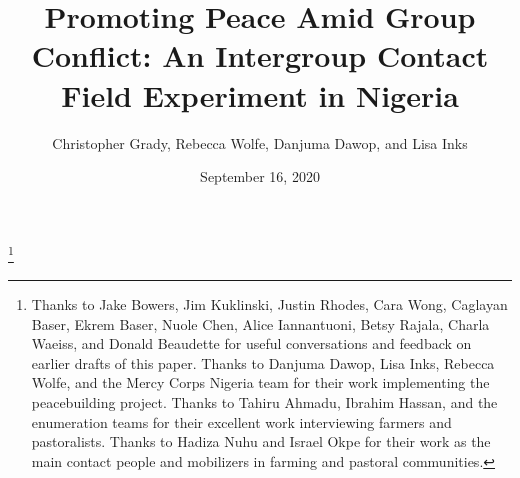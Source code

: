 \documentclass[11pt]{article}
\title{Promoting Peace Amid Group Conflict: An Intergroup Contact Field
Experiment in Nigeria}
\author{\parbox{.7\linewidth}{\centering
Christopher Grady, Rebecca Wolfe, Danjuma Dawop, and Lisa Inks
}
}
\date{September 16, 2020}
\begin{document}
\VerbatimFootnotes

%
%
%
%
%
%
%
%
%
%

\newlength{\cslhangindent}
\setlength{\cslhangindent}{1.5em}
\newenvironment{cslreferences}%
  {\setlength{\parindent}{0pt}%
  \everypar{\setlength{\hangindent}{\cslhangindent}}\ignorespaces}%
  {\par}

\maketitle


\newcommand\blfootnote[1]{%
  \begingroup
  \renewcommand\thefootnote{}\footnote{#1}%
  \addtocounter{footnote}{-1}%
  \endgroup
}
\singlespacing\blfootnote{Thanks to Jake Bowers, Jim Kuklinski, Justin
Rhodes, Cara Wong, Caglayan Baser, Ekrem Baser, Nuole Chen, Alice
Iannantuoni, Betsy Rajala, Charla Waeiss, and Donald Beaudette for
useful conversations and feedback on earlier drafts of this paper.
Thanks to Danjuma Dawop, Lisa Inks, Rebecca Wolfe, and the Mercy Corps
Nigeria team for their work implementing the peacebuilding project.
Thanks to Tahiru Ahmadu, Ibrahim Hassan, and the enumeration teams for
their excellent work interviewing farmers and pastoralists. Thanks to
Hadiza Nuhu and Israel Okpe for their work as the main contact people
and mobilizers in farming and pastoral communities.}
\end{document}
